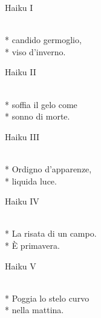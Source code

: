 \documentclass[12pt]{book}
\begin{document}
\begin{poem}{Haiku I}{}

\settowidth{\versewidth}{non meno è ciò che meriti.}

\begin{altverse}
\\*
candido germoglio,\\*
viso d'inverno.
\end{altverse}


\end{poem}

\begin{poem}{Haiku II}{}

\settowidth{\versewidth}{non meno è ciò che meriti.}

\begin{altverse}
\\*
soffia il gelo come\\*
sonno di morte.
\end{altverse}


\end{poem}

\begin{poem}{Haiku III}{}

\settowidth{\versewidth}{non meno è ciò che meriti.}

\begin{altverse}
\\*
Ordigno d'apparenze, \\*
liquida luce.
\end{altverse}


\end{poem}

\begin{poem}{Haiku IV}{}

\settowidth{\versewidth}{non meno è ciò che meriti.}

\begin{altverse}
\\*
La risata di un campo.\\*
È primavera.
\end{altverse}


\end{poem}

\begin{poem}{Haiku V}{}

\settowidth{\versewidth}{non meno è ciò che meriti.}

\begin{altverse}
\\*
Poggia lo stelo curvo\\*
nella mattina.
\end{altverse}


\end{poem}
\end{document}
